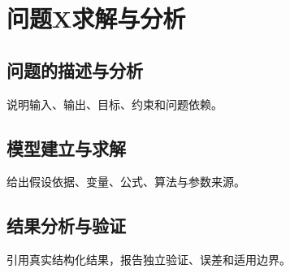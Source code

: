 \section{问题X求解与分析}

\subsection{问题的描述与分析}

说明输入、输出、目标、约束和问题依赖。


\subsection{模型建立与求解}

给出假设依据、变量、公式、算法与参数来源。

\subsection{结果分析与验证}

引用真实结构化结果，报告独立验证、误差和适用边界。


